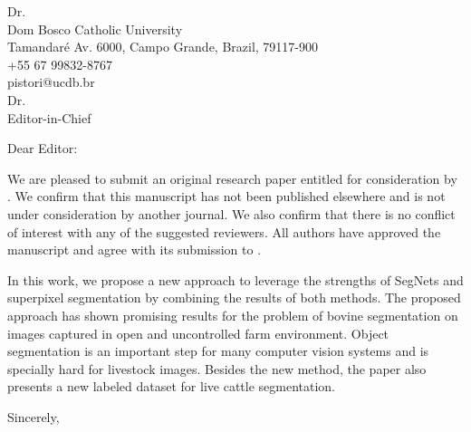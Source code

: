 \documentclass[11pt]{letter}
\begin{document}
\begin{letter}{
    Dr. \nomeAutor\\
    Dom Bosco Catholic University\\
	Tamandaré Av. 6000, Campo Grande, Brazil, 79117-900\\
    +55 67 99832-8767\\
    pistori@ucdb.br\\
    \medskip
    Dr. \nomeEditor \\
    Editor-in-Chief\\
    \textit{\nomeRevista}
  }
  \signature{
    Dr. \nomeAutor\\
  }
  \opening{Dear Editor:}

We are pleased to submit an original research paper entitled \textbf{\nomeArtigo} for consideration by \nomeRevista. We confirm that this manuscript has not been published elsewhere and is not under consideration by another journal. We also confirm that there is no conflict of interest with any of the suggested reviewers. All authors have approved the manuscript and agree with its submission to \textbf{\nomeRevista}.
		
In this work, we propose a new approach to leverage the strengths of SegNets and superpixel segmentation by combining the results of both methods. The proposed approach has shown promising results for the problem of bovine segmentation on images captured in open and uncontrolled farm environment. Object segmentation is an important step for many computer vision systems and is specially hard for livestock images. Besides the new method, the paper also presents a new labeled dataset for live cattle segmentation. 

  \closing{Sincerely,}
\end{letter}
\end{document}
